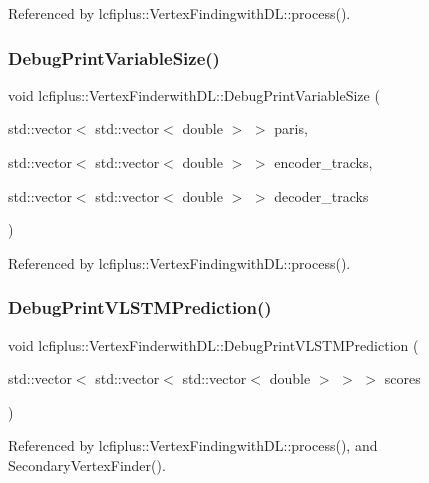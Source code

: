 Referenced by lcfiplus\+::\+Vertex\+Findingwith\+D\+L\+::process().

\mbox{\label{namespacelcfiplus_1_1VertexFinderwithDL_a44889391d0c343fdfe06b2ee5a87463e}} 
\subsubsection{Debug\+Print\+Variable\+Size()}
{\footnotesize\ttfamily void lcfiplus\+::\+Vertex\+Finderwith\+D\+L\+::\+Debug\+Print\+Variable\+Size (\begin{DoxyParamCaption}\item[{std\+::vector$<$ std\+::vector$<$ double $>$ $>$}]{paris,  }\item[{std\+::vector$<$ std\+::vector$<$ double $>$ $>$}]{encoder\+\_\+tracks,  }\item[{std\+::vector$<$ std\+::vector$<$ double $>$ $>$}]{decoder\+\_\+tracks }\end{DoxyParamCaption})}



Referenced by lcfiplus\+::\+Vertex\+Findingwith\+D\+L\+::process().

\mbox{\label{namespacelcfiplus_1_1VertexFinderwithDL_af1422ad379e596cd2cd4afc0ad364021}} 
\subsubsection{Debug\+Print\+V\+L\+S\+T\+M\+Prediction()}
{\footnotesize\ttfamily void lcfiplus\+::\+Vertex\+Finderwith\+D\+L\+::\+Debug\+Print\+V\+L\+S\+T\+M\+Prediction (\begin{DoxyParamCaption}\item[{std\+::vector$<$ std\+::vector$<$ std\+::vector$<$ double $>$ $>$ $>$}]{scores }\end{DoxyParamCaption})}



Referenced by lcfiplus\+::\+Vertex\+Findingwith\+D\+L\+::process(), and Secondary\+Vertex\+Finder().

